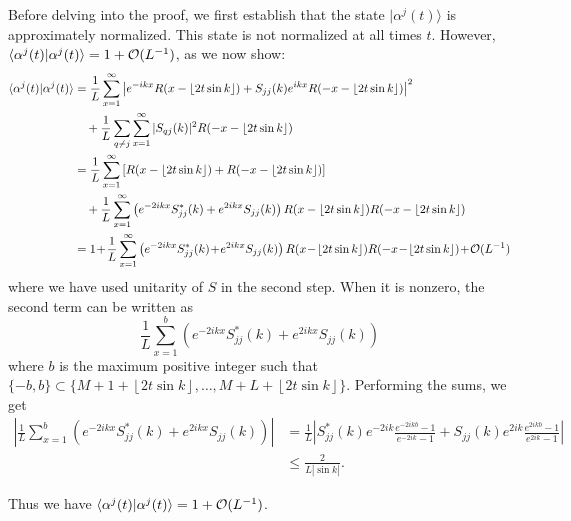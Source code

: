 \documentclass[../thesis-main/thesis-main]{subfiles}
\begin{document}
Before delving into the proof, we first establish that the state $|\alpha^{j}(t)\rangle$ is approximately normalized. This state is not normalized at all times $t$. However, $\langle\alpha^{j}(t)|\alpha^{j}(t)\rangle=1+\mathcal{O}(L^{-1})$, as we now show:
\begin{align*}
\langle\alpha^{j}(t)|\alpha^{j}(t)\rangle & =\frac{1}{L} \sum_{x=1}^{\infty}\left|e^{-ikx}R(x-\left\lfloor 2t\sin k\right\rfloor)+S_{jj}(k)e^{ikx}R(-x-\left\lfloor 2t\sin k\right\rfloor)\right|^{2} \\
 &\quad   +\frac{1}{L}\sum_{q\neq j}\sum_{x=1}^{\infty}|S_{qj}(k)|^{2} R(-x-\left\lfloor 2t\sin k\right\rfloor) \\
 & = \frac{1}{L}\sum_{x=1}^{\infty}\left[R(x-\left\lfloor 2t\sin k\right\rfloor )+R(-x-\left\lfloor 2t\sin k\right\rfloor)\right] \\
 &  \quad +\frac{1}{L}\sum_{x=1}^{\infty}\left(e^{-2ikx}S_{jj}^{\ast}(k)+e^{2ikx}S_{jj}(k)\right)R(x-\left\lfloor 2t\sin k\right\rfloor)R(-x-\left\lfloor 2t\sin k\right\rfloor) \\
 & = 1\! +\! \frac{1}{L}\sum_{x=1}^{\infty}
 	\left(e^{-2ikx}S_{jj}^{\ast}(k)\! +\! e^{2ikx}S_{jj}(k)\right)
   R(x\! -\! \left\lfloor 2t\sin k\right\rfloor)
   R(-x\! -\!\left\lfloor 2t\sin k\right\rfloor)
   \! +\!\OO(L^{-1})
\end{align*}
where we have used unitarity of $S$ in the second step.
When it is nonzero, the second term can be written as
\begin{equation}
\frac{1}{L}\sum_{x=1}^{b}\left(e^{-2ikx}S_{jj}^{\ast}(k)+e^{2ikx}S_{jj}(k)\right)
\end{equation}
where $b$ is the maximum positive integer such that $\{-b,b\}\subset\{M+1+\left\lfloor 2t\sin k\right\rfloor,\ldots,M+L+\left\lfloor 2t\sin k\right\rfloor \}$. Performing
the sums, we get
\begin{align*}
\left|\frac{1}{L}\sum_{x=1}^{b}\left(e^{-2ikx}S_{jj}^{\ast}(k)+e^{2ikx}S_{jj}(k)\right)\right| 
&= \frac{1}{L} \left|S_{jj}^{\ast}(k)e^{-2ik} \frac{e^{-2ikb}-1}{e^{-2ik}-1} 
+
S_{jj}(k)e^{2ik} \frac{e^{2ikb}-1}{e^{2ik}-1} \right|\\
 & \leq \frac{2}{L|{\sin k}|} .
\end{align*}

Thus we have $\langle\alpha^{j}(t)|\alpha^{j}(t)\rangle=1+\mathcal{O}(L^{-1})$.
\end{document}
